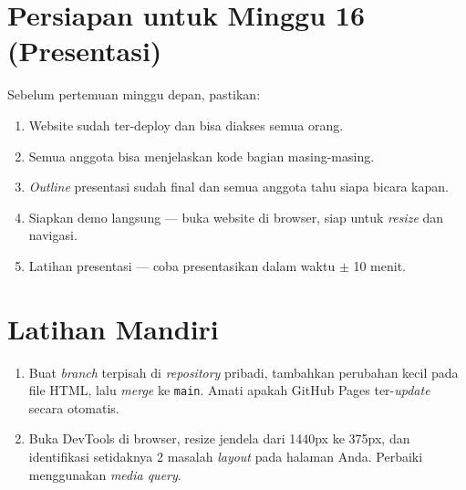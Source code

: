 \section{Persiapan untuk Minggu 16 (Presentasi)}
\label{sec:persiapan-minggu-16}

Sebelum pertemuan minggu depan, pastikan:
\begin{enumerate}
  \item Website sudah ter-deploy dan bisa diakses semua orang.
  \item Semua anggota bisa menjelaskan kode bagian masing-masing.
  \item \emph{Outline} presentasi sudah final dan semua anggota tahu siapa bicara kapan.
  \item Siapkan demo langsung --- buka website di browser, siap untuk \emph{resize} dan navigasi.
  \item Latihan presentasi --- coba presentasikan dalam waktu $\pm$ 10 menit.
\end{enumerate}

\section{Latihan Mandiri}
\label{sec:latihan-minggu-15}

\begin{latihan}
\begin{enumerate}[label=\alph*., leftmargin=2em, itemsep=2pt]
  \item Buat \emph{branch} terpisah di \emph{repository} pribadi, tambahkan perubahan kecil pada file HTML, lalu \emph{merge} ke \texttt{main}. Amati apakah GitHub Pages ter-\emph{update} secara otomatis.
  \item Buka DevTools di browser, resize jendela dari 1440px ke 375px, dan identifikasi setidaknya 2 masalah \emph{layout} pada halaman Anda. Perbaiki menggunakan \emph{media query}.
\end{enumerate}
\end{latihan}
